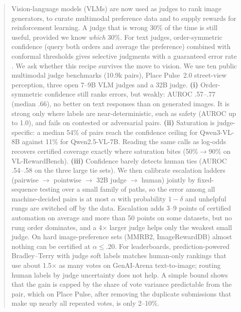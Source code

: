 \begin{abstract}
Vision-language models (VLMs) are now used as judges to rank image generators, to curate multimodal preference data and to supply rewards for reinforcement learning. A judge that is wrong 30\% of the time is still useful, provided we know \emph{which} 30\%.
For text judges, order-symmetric confidence (query both orders and average the preference) combined with conformal thresholds gives selective judgments with a guaranteed error rate \citep{badshah2026scope,jung2024trust}.
We ask whether this recipe survives the move to vision. We use ten public multimodal judge benchmarks (10.9k pairs), Place Pulse~2.0 street-view perception, three open 7--9B VLM judges and a 32B judge.
\textbf{(i)} Order-symmetric confidence still ranks errors, but weakly: AUROC .57--.77 (median .66), no better on text responses than on generated images. It is strong only where labels are near-deterministic, such as safety (AUROC up to 1.0), and fails on contested or adversarial pairs.
\textbf{(ii)} Saturation is judge-specific: a median 54\% of pairs reach the confidence ceiling for Qwen3-VL-8B against 11\% for Qwen2.5-VL-7B. Reading the same calls as log-odds recovers certified coverage exactly where saturation bites (50\%$\to$90\% on VL-RewardBench).
\textbf{(iii)} Confidence barely detects human ties (AUROC .54--.58 on the three large tie sets).
We then calibrate escalation ladders (pairwise $\rightarrow$ pointwise $\rightarrow$ 32B judge $\rightarrow$ human) jointly by fixed-sequence testing over a small family of paths, so the error among all machine-decided pairs is at most $\alpha$ with probability $1-\delta$ and unhelpful rungs are switched off by the data. Escalation adds 3--9 points of certified automation on average and more than 50 points on some datasets, but no rung order dominates, and a 4$\times$ larger judge helps only the weakest small judge. On hard image-preference sets (MMRB2, ImageRewardDB) almost nothing can be certified at $\alpha\le.20$.
For leaderboards, prediction-powered Bradley--Terry with judge soft labels matches human-only rankings that use about 1.5$\times$ as many votes on GenAI-Arena text-to-image; routing human labels by judge uncertainty does not help. A simple bound shows that the gain is capped by the share of vote variance predictable from the pair, which on Place Pulse, after removing the duplicate submissions that make up nearly all repeated votes, is only 2--10\%.
\end{abstract}
